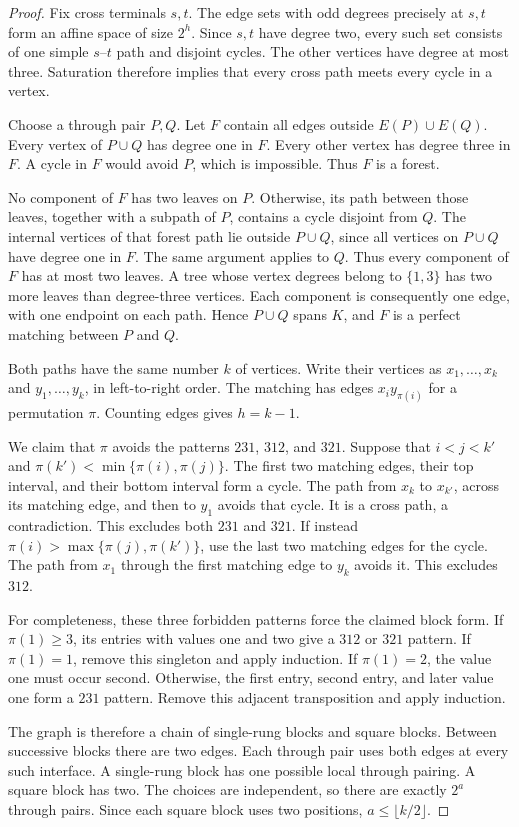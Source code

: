 \begin{proof}
Fix cross terminals $s,t$.
The edge sets with odd degrees precisely at $s,t$ form an affine space of size $2^h$.
Since $s,t$ have degree two, every such set consists of one simple $s$--$t$ path and disjoint cycles.
The other vertices have degree at most three.
Saturation therefore implies that every cross path meets every cycle in a vertex.

Choose a through pair $P,Q$.
Let $F$ contain all edges outside $E(P)\cup E(Q)$.
Every vertex of $P\cup Q$ has degree one in $F$.
Every other vertex has degree three in $F$.
A cycle in $F$ would avoid $P$, which is impossible.
Thus $F$ is a forest.

No component of $F$ has two leaves on $P$.
Otherwise, its path between those leaves, together with a subpath of $P$, contains a cycle disjoint from $Q$.
The internal vertices of that forest path lie outside $P\cup Q$, since all vertices on $P\cup Q$ have degree one in $F$.
The same argument applies to $Q$.
Thus every component of $F$ has at most two leaves.
A tree whose vertex degrees belong to $\{1,3\}$ has two more leaves than degree-three vertices.
Each component is consequently one edge, with one endpoint on each path.
Hence $P\cup Q$ spans $K$, and $F$ is a perfect matching between $P$ and $Q$.

Both paths have the same number $k$ of vertices.
Write their vertices as $x_1,\ldots,x_k$ and $y_1,\ldots,y_k$, in left-to-right order.
The matching has edges $x_i y_{\pi(i)}$ for a permutation $\pi$.
Counting edges gives $h=k-1$.

We claim that $\pi$ avoids the patterns $231$, $312$, and $321$.
Suppose that $i<j<k'$ and $\pi(k')<\min\{\pi(i),\pi(j)\}$.
The first two matching edges, their top interval, and their bottom interval form a cycle.
The path from $x_k$ to $x_{k'}$, across its matching edge, and then to $y_1$ avoids that cycle.
It is a cross path, a contradiction.
This excludes both $231$ and $321$.
If instead $\pi(i)>\max\{\pi(j),\pi(k')\}$, use the last two matching edges for the cycle.
The path from $x_1$ through the first matching edge to $y_k$ avoids it.
This excludes $312$.

For completeness, these three forbidden patterns force the claimed block form.
If $\pi(1)\ge3$, its entries with values one and two give a $312$ or $321$ pattern.
If $\pi(1)=1$, remove this singleton and apply induction.
If $\pi(1)=2$, the value one must occur second.
Otherwise, the first entry, second entry, and later value one form a $231$ pattern.
Remove this adjacent transposition and apply induction.

The graph is therefore a chain of single-rung blocks and square blocks.
Between successive blocks there are two edges.
Each through pair uses both edges at every such interface.
A single-rung block has one possible local through pairing.
A square block has two.
The choices are independent, so there are exactly $2^a$ through pairs.
Since each square block uses two positions, $a\le\lfloor k/2\rfloor$.
\end{proof}

